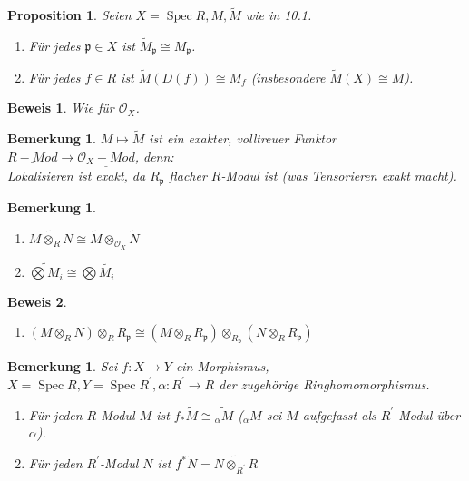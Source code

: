 \documentclass[a4paper,oneside]{scrbook}
\theoremstyle{break}
\newtheorem{Bem}[Def]{Bemerkung}
\newtheorem{Prop}[Def]{Proposition}
\theoremstyle{nonumberbreak}
\theoremstyle{nonumberplain}
\newtheorem{Bew}{Beweis}
\theoremstyle{break}
\newcommand{\Cat}[1]{%
	\ensuremath{\underline{#1}}%
}
\newcommand{\Spec}{%
	\ensuremath{\operatorname{Spec}}%
}
\begin{document}
\begin{Prop}
  \label{prop:10.2}
  Seien $X=\Spec R, M,\widetilde{M}$ wie in 10.1.
  \begin{enumerate}
  \item Für jedes $\mathfrak p\in X$ ist $\widetilde{M}_{\mathfrak p}\cong M_{\mathfrak p}$.
  \item Für jedes $f\in R$ ist $\widetilde{M}(D(f))\cong M_f$ (insbesondere $\widetilde{M}(X)\cong M$).
  \end{enumerate}
\end{Prop}

\begin{Bew}
  Wie für $\mathcal O_X$.
\end{Bew}

\begin{Bem}
  \label{bem:10.3}
  $M\mapsto \widetilde{M}$ ist ein exakter, volltreuer Funktor $\Cat{R-Mod}\to\Cat{\mathcal O_X-Mod}$, denn: \\
  Lokalisieren ist exakt, da $R_{\mathfrak p}$ flacher $R$-Modul ist (was Tensorieren exakt macht).
\end{Bem}

\begin{Bem}
  \label{bem:10.4}
  \begin{enumerate}
  \item $\widetilde{M\otimes_RN}\cong\widetilde{M}\otimes_{\mathcal O_X}\widetilde{N}$
  \item $\widetilde{\bigotimes M_i}\cong\bigotimes\widetilde{M_i}$
  \end{enumerate}
\end{Bem}

\begin{Bew}
  \begin{enumerate}
  \item $(M\otimes_RN)\otimes_RR_{\mathfrak p}\cong (M\otimes_RR_{\mathfrak p})\otimes_{R_{\mathfrak p}}(N\otimes_RR_{\mathfrak p})$
  \end{enumerate}
\end{Bew}

\begin{Bem}
  \label{bem:10.5}
  Sei $f:X\to Y$ ein Morphismus, $X=\Spec R, Y=\Spec R^\prime, \alpha: R^\prime\to R$ der zugehörige Ringhomomorphismus.
  \begin{enumerate}
  \item Für jeden $R$-Modul $M$ ist $f_\ast\widetilde{M}\cong \widetilde{_\alpha M}$ ($_\alpha M$ sei $M$ aufgefasst als $R^\prime$-Modul über $\alpha$).
  \item Für jeden $R^\prime$-Modul $N$ ist $f^\ast\widetilde{N}=\widetilde{N\otimes_{R^\prime}R}$
  \end{enumerate}
\end{Bem}
\end{document}
